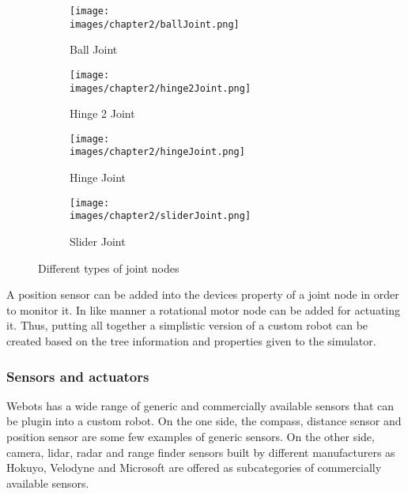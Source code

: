 \begin{figure}[h!]
  \centering
  \begin{subfigure}[b]{0.47\linewidth}
  	\texttt{[image: \\images/chapter2/ballJoint.png]}
  	\caption{Ball Joint}
  	\label{fig:ch-2:ball-joint}
  \end{subfigure}
  \vspace{0.00mm}
  \begin{subfigure}[b]{0.47\linewidth}
  	\texttt{[image: \\images/chapter2/hinge2Joint.png]}
  	\caption{Hinge 2 Joint}
  	\label{fig:ch-2:highe-2-joint}
  \end{subfigure}
  \vspace{0.00mm}
  \begin{subfigure}[b]{0.47\linewidth}
  	\texttt{[image: \\images/chapter2/hingeJoint.png]}
  	\caption{Hinge Joint}
  	\label{fig:ch-2:hinge-joint}
  \end{subfigure}
  \vspace{0.00mm}
  \begin{subfigure}[b]{0.47\linewidth}
  	\texttt{[image: \\images/chapter2/sliderJoint.png]}
  	\caption{Slider Joint}
  	\label{fig:ch-2:slider-joint}
  \end{subfigure}
  \caption{Different types of joint nodes}
  \label{fig:ch-2:joints}
\end{figure}


A position sensor can be added into the devices property of a joint node in order to monitor it. In like manner a rotational motor node can be added for actuating it. Thus, putting all together a simplistic version of a custom robot can be created based on the tree information and properties given to the simulator.

\subsubsection{Sensors and actuators}

Webots has a wide range of generic and commercially available sensors that can be plugin into a custom robot. On the one side, the compass, distance sensor and position sensor are some few examples of generic sensors. On the other side, camera, lidar, radar and range finder sensors built by different manufacturers as Hokuyo, Velodyne and Microsoft are offered as subcategories of commercially available sensors. 

